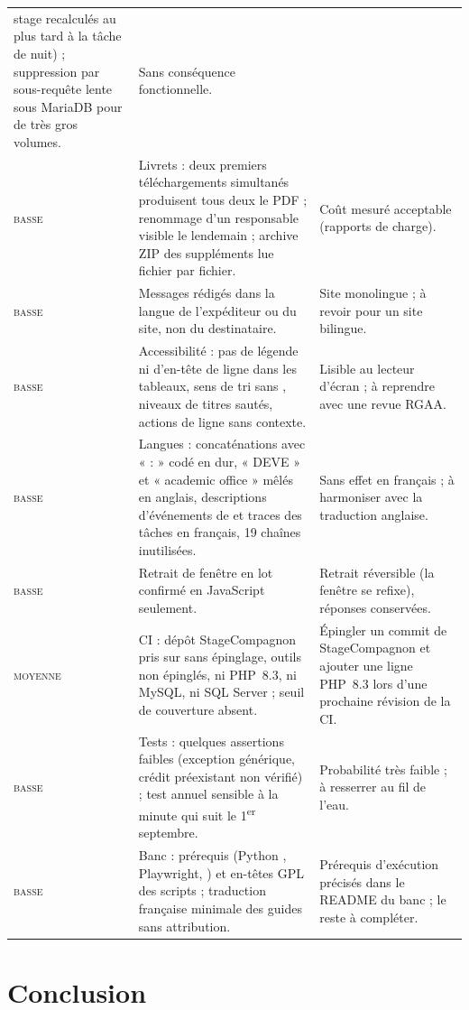 \documentclass[11pt,a4paper]{article}
\newcommand{\code}[1]{\texttt{\detokenize{#1}}}
\newcommand{\grav}[1]{\textsc{#1}}
\begin{document}
\begin{xltabular}{\linewidth}{@{}l X X@{}}
stage recalculés au plus tard à la tâche de nuit) ; suppression par sous-requête lente sous
MariaDB pour de très gros volumes. & Sans conséquence fonctionnelle. \\
\grav{basse} & Livrets : deux premiers téléchargements simultanés produisent tous deux le PDF ;
renommage d'un responsable visible le lendemain ; archive ZIP des suppléments lue fichier par
fichier. & Coût mesuré acceptable (rapports de charge). \\
\grav{basse} & Messages rédigés dans la langue de l'expéditeur ou du site, non du destinataire.
& Site monolingue ; à revoir pour un site bilingue. \\
\grav{basse} & Accessibilité : pas de légende ni d'en-tête de ligne dans les tableaux, sens de
tri sans \code{aria-sort}, niveaux de titres sautés, actions de ligne sans contexte. & Lisible
au lecteur d'écran ; à reprendre avec une revue RGAA. \\
\grav{basse} & Langues : concaténations avec « : » codé en dur, « DEVE » et « academic office »
mêlés en anglais, descriptions d'événements de \code{mod_ep} et traces des tâches en français,
19 chaînes inutilisées. & Sans effet en français ; à harmoniser avec la traduction anglaise. \\
\grav{basse} & Retrait de fenêtre en lot confirmé en JavaScript seulement. & Retrait réversible
(la fenêtre se refixe), réponses conservées. \\
\grav{moyenne} & CI : dépôt StageCompagnon pris sur \code{main} sans épinglage, outils non
épinglés, ni PHP~8.3, ni MySQL, ni SQL Server ; seuil de couverture absent. & Épingler un
commit de StageCompagnon et ajouter une ligne PHP~8.3 lors d'une prochaine révision de la CI. \\
\grav{basse} & Tests : quelques assertions faibles (exception générique, crédit préexistant non
vérifié) ; test annuel sensible à la minute qui suit le 1\textsuperscript{er} septembre. &
Probabilité très faible ; à resserrer au fil de l'eau. \\
\grav{basse} & Banc : prérequis (Python \code{requests}, Playwright, \code{pdftoppm}) et en-têtes
GPL des scripts ; traduction française minimale des guides sans attribution. & Prérequis
d'exécution précisés dans le README du banc ; le reste à compléter. \\
\bottomrule
\end{xltabular}

\section{Conclusion}
\end{document}
